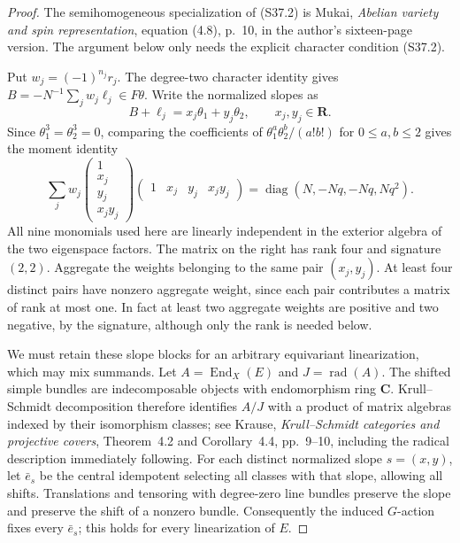 \begin{proof}
The semihomogeneous specialization of (S37.2) is Mukai,
\emph{Abelian variety and spin representation}, equation
(4.8), p.~10, in the author's sixteen-page version.
The argument below only needs the explicit character
condition (S37.2).

Put $w_j=(-1)^{n_j}r_j$. The degree-two character
identity gives
$B=-N^{-1}\sum_jw_j\ell_j\in F\theta$.
Write the normalized slopes as
\[
 B+\ell_j=x_j\theta_1+y_j\theta_2,
 \qquad x_j,y_j\in\mathbf R.
\]
Since $\theta_1^3=\theta_2^3=0$, comparing the
coefficients of $\theta_1^a\theta_2^b/(a!b!)$
for $0\le a,b\le2$ gives the moment identity
\[
 \sum_j w_j
 \begin{pmatrix}1\\x_j\\y_j\\x_jy_j\end{pmatrix}
 \begin{pmatrix}1&x_j&y_j&x_jy_j\end{pmatrix}
 =\operatorname{diag}(N,-Nq,-Nq,Nq^2).
 \tag{S37.4}
\]
All nine monomials used here are linearly independent
in the exterior algebra of the two eigenspace factors.
The matrix on the right has rank four and signature
$(2,2)$. Aggregate the weights belonging to the same
pair $(x_j,y_j)$. At least four distinct pairs have
nonzero aggregate weight, since each pair contributes
a matrix of rank at most one. In fact at least two
aggregate weights are positive and two negative, by
the signature, although only the rank is needed below.

We must retain these slope blocks for an arbitrary
equivariant linearization, which may mix summands.
Let $A=\operatorname{End}_X(E)$ and $J=\operatorname{rad}(A)$.
The shifted simple bundles are indecomposable objects
with endomorphism ring $\mathbf C$. Krull--Schmidt
decomposition therefore identifies $A/J$ with a product
of matrix algebras indexed by their isomorphism classes;
see Krause, \emph{Krull--Schmidt categories and projective
covers}, Theorem~4.2 and Corollary~4.4, pp.~9--10,
including the radical description immediately following.
For each distinct normalized slope $s=(x,y)$, let
$\bar e_s$ be the central idempotent selecting all
classes with that slope, allowing all shifts.
Translations and tensoring with degree-zero line bundles
preserve the slope and preserve the shift of a nonzero
bundle. Consequently the induced $G$-action fixes every
$\bar e_s$; this holds for every linearization of $E$.


\end{proof}
